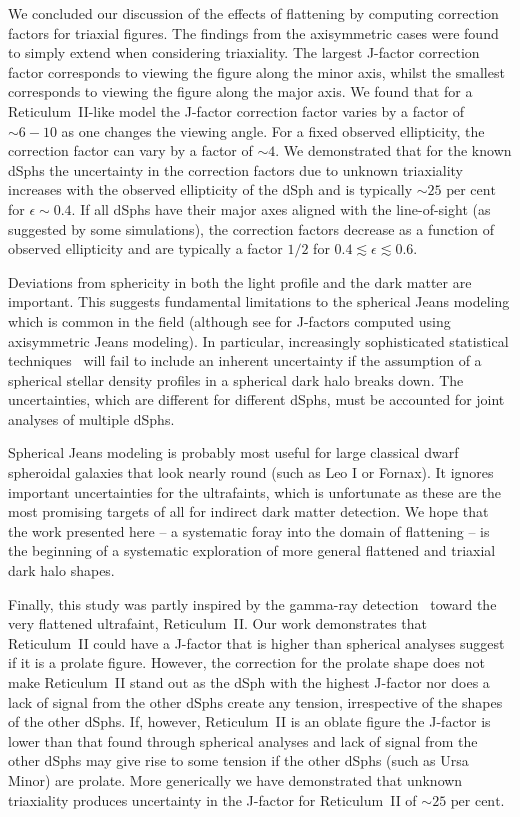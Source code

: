 \documentclass[prd,twocolumn,showpacs,preprintnumbers,superscriptaddress,nofootinbib,amsmath,amssymb,nobalancelastpage]{revtex4}
\def\percent{\text{ per cent}}
\def\percent{\text{ per cent}}
\begin{document}
We concluded our discussion of the effects of flattening by computing correction factors for triaxial figures. The findings from the axisymmetric cases were found to simply extend when considering triaxiality. The largest J-factor correction factor corresponds to viewing the figure along the minor axis, whilst the smallest corresponds to viewing the figure along the major axis. We found that for a Reticulum~II-like model the J-factor correction factor varies by a factor of $\sim 6-10$ as one changes the viewing angle. For a fixed observed ellipticity, the correction factor can vary by a factor of $\sim4$. We demonstrated that for the known dSphs the uncertainty in the correction factors due to unknown triaxiality increases with the observed ellipticity of the dSph and is typically $\sim25\percent$ for $\epsilon\sim0.4$. If all dSphs have their major axes aligned with the line-of-sight (as suggested by some simulations), the correction factors decrease as a function of observed ellipticity and are typically a factor $1/2$ for $0.4\lesssim\epsilon\lesssim0.6$.

Deviations from sphericity in both the light profile and the dark
matter are important. This suggests fundamental limitations to the
spherical Jeans modeling which is common in the field (although see \citep{Hayashi2016} for J-factors computed using axisymmetric Jeans modeling). In
particular, increasingly sophisticated statistical
techniques~\citep{Mar15,Co15} will fail to include an inherent uncertainty if the assumption of a
spherical stellar density profiles in a spherical dark halo breaks
down. The uncertainties, which are different for different dSphs, must be accounted for joint analyses of multiple dSphs.

Spherical Jeans modeling is probably most useful for large
classical dwarf spheroidal galaxies that look nearly round (such as
Leo I or Fornax). It ignores important uncertainties for the ultrafaints, which is
unfortunate as these are the most promising targets of all for
indirect dark matter detection. We hope that the work presented here
-- a systematic foray into the domain of flattening -- is the
beginning of a systematic exploration of more general flattened and
triaxial dark halo shapes.

Finally, this study was partly inspired by the gamma-ray detection~\citep{2015PhRvL.115h1101G} toward the very flattened ultrafaint, Reticulum~II. Our work demonstrates that Reticulum~II could have a J-factor that is higher than spherical analyses suggest if it is a prolate figure. However, the correction for the prolate shape does not make Reticulum~II stand out as the dSph with the highest J-factor nor does a lack of signal from the other dSphs create any tension, irrespective of the shapes of the other dSphs. If, however, Reticulum~II is an oblate figure the J-factor is lower than that found through spherical analyses and lack of signal from the other dSphs may give rise to some tension if the other dSphs (such as Ursa Minor) are prolate. More generically we have demonstrated that unknown triaxiality produces uncertainty in the J-factor for Reticulum~II of $\sim25\percent$.
\end{document}
